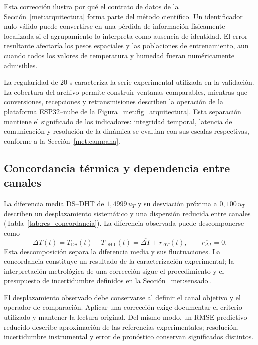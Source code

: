 Esta corrección ilustra por qué el contrato de datos de la Sección~\ref{met:arquitectura} forma parte del método científico. Un identificador nulo válido puede convertirse en una pérdida de información físicamente localizada si el agrupamiento lo interpreta como ausencia de identidad. El error resultante afectaría los pesos espaciales y las poblaciones de entrenamiento, aun cuando todos los valores de temperatura y humedad fueran numéricamente admisibles.

La regularidad de $20$ s caracteriza la serie experimental utilizada en la validación. La cobertura del archivo permite construir ventanas comparables, mientras que conversiones, recepciones y retransmisiones describen la operación de la plataforma ESP32--nube de la Figura~\ref{met:fig_arquitectura}. Esta separación mantiene el significado de los indicadores: integridad temporal, latencia de comunicación y resolución de la dinámica se evalúan con sus escalas respectivas, conforme a la Sección~\ref{met:campana}.

\subsection{Concordancia térmica y dependencia entre canales}

La diferencia media DS--DHT de $1{,}4999\,u_T$ y su desviación próxima a $0{,}100\,u_T$ describen un desplazamiento sistemático y una dispersión reducida entre canales (Tabla~\ref{tab:res_concordancia}). La diferencia observada puede descomponerse como
\begin{equation}
\Delta T(t)=T_{\mathrm{DS}}(t)-T_{\mathrm{DHT}}(t)
=\overline{\Delta T}+r_{\Delta T}(t),
\qquad \overline{r_{\Delta T}}=0.
\label{eq:dis_concordancia}
\end{equation}
Esta descomposición separa la diferencia media y sus fluctuaciones. La concordancia constituye un resultado de la caracterización experimental; la interpretación metrológica de una corrección sigue el procedimiento y el presupuesto de incertidumbre definidos en la Sección~\ref{met:sensado}.

El desplazamiento observado debe conservarse al definir el canal objetivo y el operador de comparación. Aplicar una corrección exige documentar el criterio utilizado y mantener la lectura original. Del mismo modo, un RMSE predictivo reducido describe aproximación de las referencias experimentales; resolución, incertidumbre instrumental y error de pronóstico conservan significados distintos.

